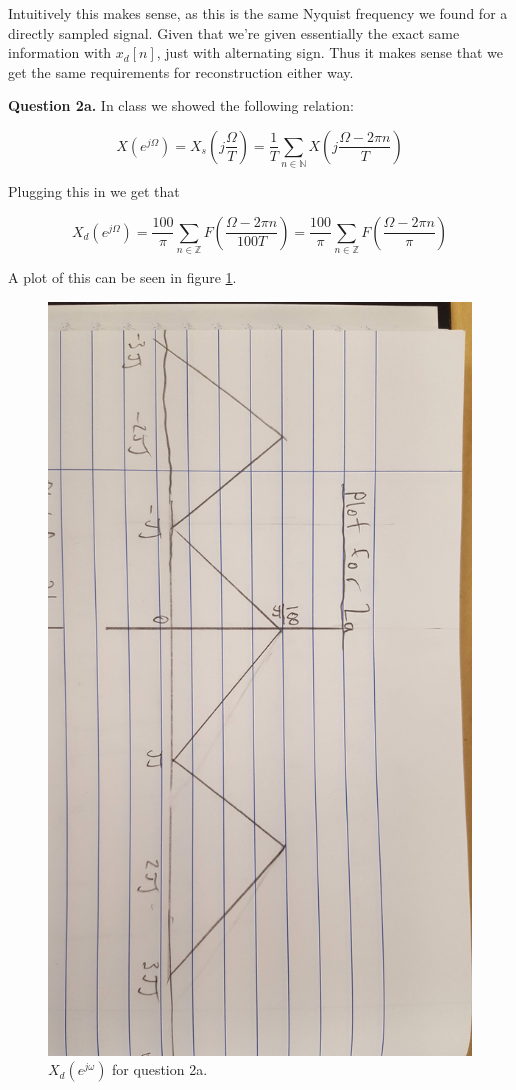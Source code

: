 \documentclass[letterpaper, reqno,11pt]{article}
\newcommand{\ZZ}{\mathbb{Z}}
\newcommand{\NN}{\mathbb{N}}
\begin{document}
Intuitively this makes sense, as this is the same Nyquist frequency we found for a directly sampled signal. Given that we're given essentially the exact same information with $x_d[n]$, just with alternating sign. Thus it makes sense that we get the same requirements for reconstruction either way. 

{\noindent\bf Question 2a.} In class we showed the following relation: 

\[
    X(e^{j\Omega})=X_s(j\frac{\Omega}{T})=\frac1T\sum_{n\in\NN} X(j\frac{\Omega-2\pi n}{T})
\]

Plugging this in we get that 

\[
    X_d(e^{j\Omega})=\frac{100}\pi\sum_{n\in\ZZ}F(\frac{\Omega-2\pi n}{100T})=\frac{100}\pi\sum_{n\in\ZZ}F(\frac{\Omega-2\pi n}\pi)
\]

A plot of this can be seen in figure \ref{fig:2a}. 

\begin{figure}[htbp]
\centering
\includegraphics[width=\textwidth]{2a}
\caption{$X_d(e^{j\omega})$ for question 2a. }
\label{fig:2a}
\end{figure}
\end{document}
